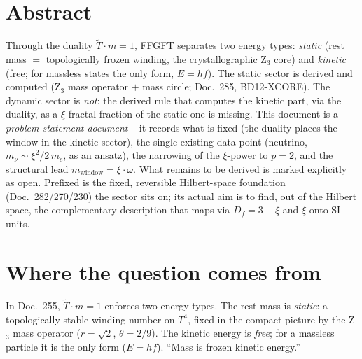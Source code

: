 
\section*{Abstract}
Through the duality $\tilde T\cdot m=1$, FFGFT separates two energy types: \emph{static} (rest mass
$=$ topologically frozen winding, the crystallographic Z$_3$ core) and \emph{kinetic} (free; for
massless states the only form, $E=hf$). The static sector is derived and computed (Z$_3$ mass
operator $+$ mass circle; Doc.~285, BD12-XCORE). The dynamic sector is \emph{not}: the derived rule
that computes the kinetic part, via the duality, as a $\xi$-fractal fraction of the static one is
missing. This document is a \emph{problem-statement document} -- it records what is fixed (the
duality places the window in the kinetic sector), the single existing data point (neutrino,
$m_\nu\sim\xi^2/2\,m_e$, as an ansatz), the narrowing of the $\xi$-power to $p=2$, and the structural
lead $m_{\text{window}}=\xi\cdot\omega$. What remains to be derived is marked explicitly as open. Prefixed is the fixed, reversible Hilbert-space foundation (Doc.~282/270/230) the sector sits on; its actual aim is to find, out of the Hilbert space, the complementary description that maps via $D_f=3-\xi$ and $\xi$ onto SI units.

\section{Where the question comes from}
In Doc.~255, $\tilde T\cdot m=1$ enforces two energy types. The rest mass is \emph{static}: a
topologically stable winding number on $T^4$, fixed in the compact picture by the Z$_3$ mass operator
($r=\sqrt2$, $\theta=2/9$). The kinetic energy is \emph{free}; for a massless particle it is the only
form ($E=hf$). \enquote{Mass is frozen kinetic energy.}

